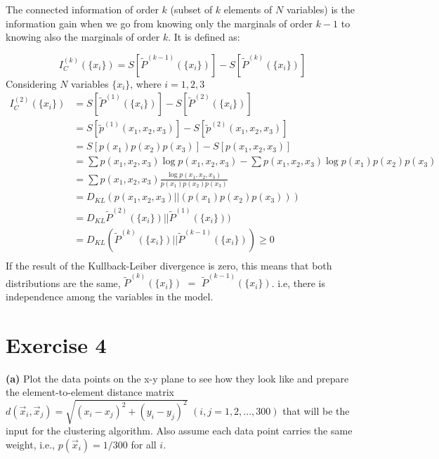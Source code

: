 \documentclass[11pt]{article}
\makeatletter
\newenvironment{proofw}{\par
	\pushQED{\qed}%
	\normalfont \topsep6\p@\@plus6\p@\relax
	\trivlist
	\item[]\ignorespaces
}{%
	\popQED\endtrivlist\@endpefalse
}
\makeatother
\begin{document}
The connected information of order $k$ (subset of $k$ elements of $N$ variables) is the information gain when we go from knowing only the marginals of order $k-1$ to knowing also the marginals of order $k$. It is defined as:
\begin{proofw}
\begin{equation*}
{I}^{(k)}_{C}(\{x_{i}\}) = S[{\tilde{P}}^{(k-1)}(\{x_{i}\})] - S[{\tilde{P}}^{(k)}(\{x_{i}\})]
\end{equation*}
Considering $N$ variables $\{x_{i}\}$, where $i = 1,2,3$
\begin{equation*}
\begin{split}
{I}^{(2)}_{C}(\{x_{i}\}) &= S[{\tilde{P}}^{(1)}(\{x_{i}\})] - S[{\tilde{P}}^{(2)}(\{x_{i}\})]\\
 &= S[{\tilde{p}}^{(1)}(x_{1}, x_{2}, x_{3})] - S[{\tilde{p}}^{(2)}(x_{1}, x_{2}, x_{3})]\\
  &= S[p(x_{1})p(x_{2})p(x_{3})] - S[p(x_{1},x_{2},x_{3})]\\ 
  &= \sum p(x_{1},x_{2},x_{3}) \log p(x_{1},x_{2},x_{3}) - \sum p(x_{1},x_{2},x_{3}) \log p(x_{1})p(x_{2})p(x_{3})  \\ 
  &= \sum p(x_{1},x_{2},x_{3}) \frac{\log p(x_{1},x_{2},x_{3}) }{p(x_{1})p(x_{2})p(x_{3})}\\ 
   &= D_{KL}(p(x_{1},x_{2},x_{3})||(p(x_{1})p(x_{2})p(x_{3}))) \\ 
  &= D_{KL}{\tilde{P}}^{(2)}(\{x_{i}\})||{\tilde{P}}^{(1)}(\{x_{i}\})) \\ 
  &= D_{KL}({\tilde{P}}^{(k)}(\{x_{i}\})||{\tilde{P}}^{(k-1)}(\{x_{i}\})) \geq 0 \\ 
\end{split}
\end{equation*}
If the result of the Kullback-Leiber divergence is zero, this means that both distributions are the same, ${\tilde{P}}^{(k)}(\{x_{i}\})$ $=$ $\tilde{P}^{(k-1)}(\{x_{i}\})$. i.e, there is independence among the variables in the model.
\end{proofw}

\section{Exercise 4}
\begin{tcolorbox}
\textbf{(a)}
Plot the data points on the x-y plane to see how they look like and
prepare the element-to-element distance matrix $d(\vec{x}_{i},\vec{x}_{j}) = \sqrt{{(x_{i}- x_{j})}^{2}+ {(y_{i}-y_{j})}^{2}}$
$(i,j = 1,2,...,300)$ that will be the input for the clustering algorithm. Also assume each data point carries the same weight, i.e., $p(\vec{x}_{i}) = 1/300$ for all $i$.
\end{tcolorbox}
\end{document}
